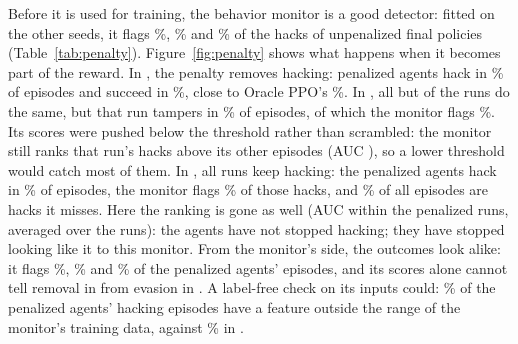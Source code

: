 \begin{table}[t]
\centering
\caption{How penalized agents evade the monitor. For the hacking episodes of
the last monitored snapshot of unpenalized and penalized Proxy PPO (ID), the
three behavior features that changed the monitor's mean logit most, their
standard deviation in the monitor's training data, and each feature's signed
share of the total change (negative: the feature moved towards looking like a
hack). \PF{} is omitted because its penalized agents produce almost no hacks.
In \ST{} the monitor still ranks the run's hacks correctly; these changes lower
its scores without hiding the hacks.}
\label{tab:evasion}
\small
\resizebox{\linewidth}{!}{}
\end{table}

Before it is used for training, the behavior monitor is a good detector:
fitted on the other seeds, it flags \%,
\% and \%
of the hacks of unpenalized final policies (Table~\ref{tab:penalty}).
Figure~\ref{fig:penalty} shows what happens when it becomes part of the reward.
In \PF{}, the penalty removes hacking: penalized agents hack in
\% of episodes and succeed in
\%, close to Oracle PPO's
\%. In \ST{}, all but
 of the  runs do the same, but
that run tampers in \% of episodes, of which
the monitor flags \%. Its scores were
pushed below the threshold rather than scrambled: the monitor still ranks that
run's hacks above its other episodes (AUC
), so a lower threshold would catch most of
them. In \GT{}, all
 runs keep hacking: the penalized agents hack in
\% of episodes, the monitor flags
\% of those hacks, and
\% of all episodes are hacks it misses. Here
the ranking is gone as well (AUC  within the
penalized runs, averaged over the  runs):
the agents have not stopped hacking; they have stopped looking like it to this
monitor. From the
monitor's side, the outcomes look alike: it flags
\%, \% and
\% of the penalized agents' episodes, and its scores
alone cannot tell removal in \PF{} from evasion in \GT{}. A label-free check on
its inputs could: \% of the penalized \GT{}
agents' hacking episodes have a feature outside the range of the monitor's
training data, against \% in \ST{}.

